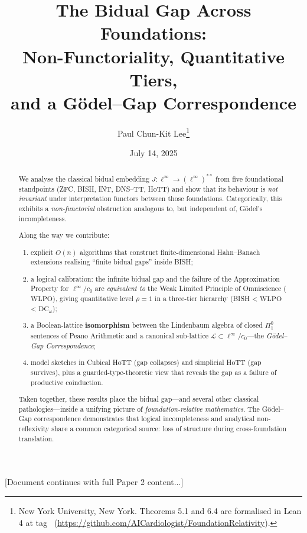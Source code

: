 \documentclass[11pt]{article}
\title{The Bidual Gap Across Foundations:\\
       Non-Functoriality, Quantitative Tiers,\\
       and a Gödel--Gap Correspondence}
\author{Paul Chun-Kit Lee\thanks{New York University, New York.  Theorems 5.1 and 6.4 are formalised in Lean 4 at
tag \leanRepoTag\ (\url{https://github.com/AICardiologist/FoundationRelativity}).}}
\date{July 14, 2025}
\theoremstyle{definition}
\newcommand{\WLPO}{\ensuremath{\mathrm{WLPO}}}
\newcommand{\DCw}{\ensuremath{\mathrm{DC}_{\!\omega}}}
\begin{document}
\maketitle

\begin{abstract}
We analyse the classical bidual embedding
$J:\ell^\infty\to(\ell^\infty)^{**}$ from five
foundational standpoints (ZFC, BISH, INT, DNS--TT, HoTT) and show that
its behaviour is \emph{not invariant} under interpretation functors
between those foundations. Categorically, this exhibits a
\emph{non-functorial} obstruction analogous to, but independent of,
Gödel's incompleteness.

Along the way we contribute:

\begin{enumerate}[label=(\roman*)]
\item explicit $O(n)$ algorithms that construct finite-dimensional
      Hahn--Banach extensions realising ``finite bidual gaps'' inside
      BISH;
\item a logical calibration: the infinite bidual gap and the failure
      of the Approximation Property for $\ell^\infty/c_0$ are
      \emph{equivalent to} the Weak Limited Principle of Omniscience
      (\WLPO), giving quantitative level $\rho=1$ in a three-tier
      hierarchy (BISH < \WLPO{} < \DCw);
\item a Boolean-lattice \textbf{isomorphism} between the Lindenbaum
      algebra of closed $\Pi^0_1$ sentences of Peano Arithmetic and a
      canonical sub-lattice
      $\mathcal L\subset\ell^\infty/c_0$---the
      \emph{Gödel--Gap Correspondence};
\item model sketches in Cubical HoTT (gap collapses) and
      simplicial HoTT (gap survives), plus a guarded-type-theoretic
      view that reveals the gap as a failure of productive coinduction.
\end{enumerate}

Taken together, these results place the bidual gap---and several other
classical pathologies---inside a unifying picture of
\emph{foundation-relative mathematics}. The Gödel--Gap correspondence
demonstrates that logical incompleteness and analytical non-reflexivity
share a common categorical source: loss of structure during
cross-foundation translation.
\end{abstract}

[Document continues with full Paper 2 content...]
\end{document}

